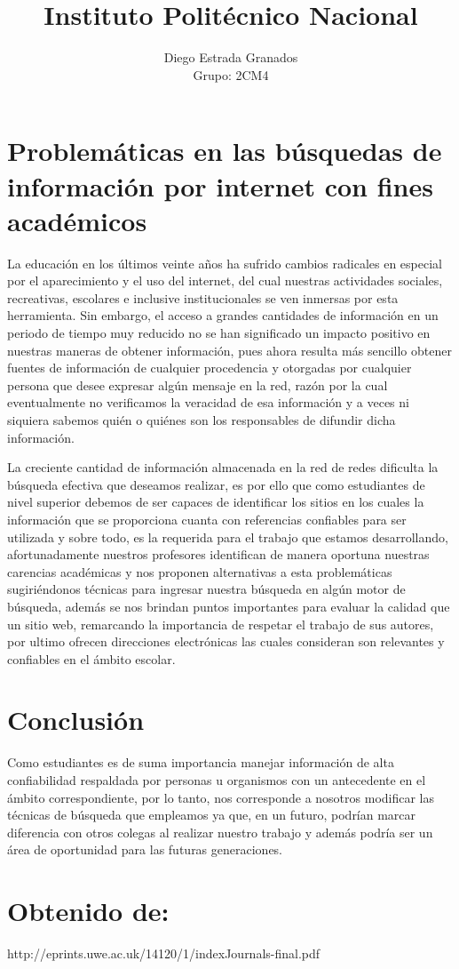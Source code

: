 \documentclass[12pt,letterpaper]{article}
\author{Diego Estrada Granados\\Grupo: 2CM4}
\title{Instituto Politécnico Nacional}
\begin{document}
\maketitle
\section*{Problemáticas en las búsquedas de información por internet con fines académicos}


La educación en los últimos veinte años ha sufrido cambios radicales en especial por el aparecimiento y el uso del internet, del cual nuestras actividades sociales, recreativas, escolares e inclusive institucionales se ven inmersas por esta herramienta. Sin embargo, el acceso a grandes cantidades de información en un periodo de tiempo muy reducido no se han significado un impacto positivo en nuestras maneras de obtener información, pues ahora resulta más sencillo obtener fuentes de información de cualquier procedencia y otorgadas por cualquier persona que desee expresar algún mensaje en la red, razón por la cual eventualmente no verificamos la veracidad de esa información y a veces ni siquiera sabemos quién o quiénes son los responsables de difundir dicha información.


La creciente cantidad de información almacenada en la red de redes dificulta la búsqueda efectiva que deseamos realizar, es por ello que como estudiantes de nivel superior debemos de ser capaces de identificar los sitios en los cuales la información que se proporciona cuanta con referencias confiables para ser utilizada y sobre todo, es la requerida para el trabajo que estamos desarrollando, afortunadamente nuestros profesores identifican de manera oportuna nuestras carencias académicas y nos proponen alternativas a esta problemáticas sugiriéndonos técnicas para ingresar nuestra búsqueda en algún motor de búsqueda, además se nos brindan puntos importantes para evaluar la calidad que un  sitio web, remarcando la importancia de respetar el trabajo de sus autores, por ultimo ofrecen direcciones electrónicas las cuales consideran son relevantes y confiables en el ámbito escolar.


\section*{Conclusión}

Como estudiantes es de suma importancia manejar información de alta confiabilidad respaldada por personas u organismos con un antecedente en el ámbito correspondiente, por lo tanto, nos corresponde a nosotros modificar las técnicas de búsqueda que empleamos ya que, en un futuro, podrían marcar diferencia con otros colegas al realizar nuestro trabajo y además podría ser un área de oportunidad para las futuras generaciones.

\section*{Obtenido de:}
http://eprints.uwe.ac.uk/14120/1/indexJournals-final.pdf
\end{document}
